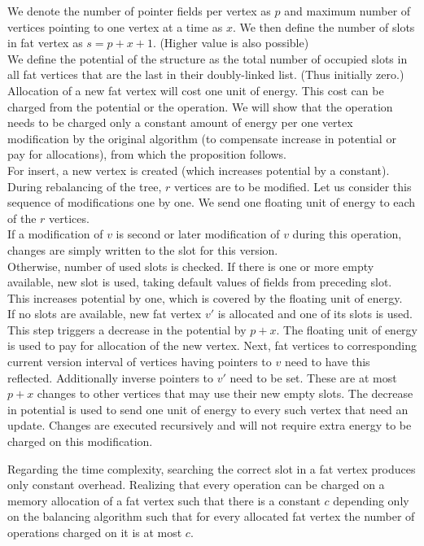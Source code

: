 \begin{myproof}
We denote the number of pointer fields per vertex as $p$ and maximum number of vertices pointing to one vertex at a time as $x$. We then define the number of slots in fat vertex as $s = p + x + 1$. (Higher value is also possible)\\
We define the potential of the structure as the total number of occupied slots in all fat vertices that are the last in their doubly-linked list. (Thus initially zero.) Allocation of a new fat vertex will cost one unit of energy. This cost can be charged from the potential or the operation. We will show that the operation needs to be charged only a constant amount of energy per one vertex modification by the original algorithm (to compensate increase in potential or pay for allocations), from which the proposition follows.\\
For insert, a new vertex is created (which increases potential by a constant). During rebalancing of the tree, $r$ vertices are to be modified. Let us consider this sequence of modifications one by one. We send one floating unit of energy to each of the $r$ vertices.\\
If a modification of $v$ is second or later modification of $v$ during this operation, changes are simply written to the slot for this version.\\
Otherwise, number of used slots is checked. If there is one or more empty available, new slot is used, taking default values of fields from preceding slot. This increases potential by one, which is covered by the floating unit of energy.\\
If no slots are available, new fat vertex $v'$ is allocated and one of its slots is used. This step triggers a decrease in the potential by $p+x$. The floating unit of energy is used to pay for allocation of the new vertex. Next, fat vertices to corresponding current version interval of vertices having pointers to $v$ need to have this reflected. Additionally inverse pointers to $v'$ need to be set. These are at most $p+x$ changes to other vertices that may use their new empty slots. The decrease in potential is used to send one unit of energy to every such vertex that need an update. Changes are executed recursively and will not require extra energy to be charged on this modification.
\end{myproof}

Regarding the time complexity, searching the correct slot in a fat vertex produces only constant overhead. Realizing that every operation can be charged on a memory allocation of a fat vertex such that there is a constant $c$ depending only on the balancing algorithm such that for every allocated fat vertex the number of operations charged on it is at most $c$.

